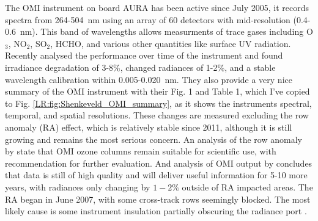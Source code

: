     The OMI instrument on board AURA has been active since July 2005, it records spectra from 264-504~nm using an array of 60 detectors with mid-resolution (0.4-0.6~nm).
    This band of wavelengths allows measurments of trace gases including O$_3$, NO$_2$, SO$_2$, HCHO, and various other quantities like surface UV radiation.
    Recently \cite{Schenkeveld2017} analysed the performance over time of the instrument and found irradiance degradation of 3-8\%, changed radiances of 1-2\%, and a stable wavelength calibration within 0.005-0.020~nm.
    They also provide a very nice summary of the OMI instrument with their Fig. 1 and Table 1, which I've copied to Fig. \ref{LR:fig:Shenkeveld_OMI_summary}, as it shows the instruments spectral, temporal, and spatial resolutions.
    These changes are measured excluding the row anomaly (RA) effect, which is relatively stable since 2011, although it is still growing and remains the most serious concern.
    An analysis of the row anomaly by \cite{Huang2017} state that OMI ozone columns remain suitable for scientific use, with recommendation for further evaluation.
    And analysis of OMI output by \cite{Schenkeveld2017} concludes that data is still of high quality and will deliver useful information for 5-10 more years, with radiances only changing by $1-2\%$ outside of RA impacted areas.
    The RA began in June 2007, with some cross-track rows seemingly blocked. The most likely cause is some instrument insulation partially obscuring the radiance port \citep{Schenkeveld2017}.
    
